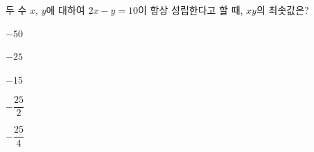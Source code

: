 \hspace*{2mm}\begin{minipage}[t]{\dimexpr\linewidth-2mm\relax}\vspace{0pt}
두 수 $x$, $y$에 대하여 $2x-y=10$이 항상 성립한다고 할 때, $xy$의 최솟값은?
\begin{choices32}{\rule[-3ex]{0pt}{8ex}$-50$}{\rule[-3ex]{0pt}{8ex}$-25$}{\rule[-3ex]{0pt}{8ex}$-15$}{\rule[-3ex]{0pt}{8ex}$-\dfrac{25}{2}$}{\rule[-3ex]{0pt}{8ex}$-\dfrac{25}{4}$}\end{choices32}\end{minipage}

